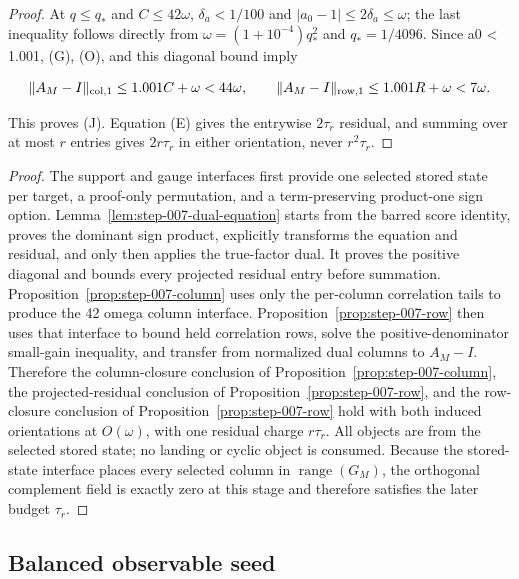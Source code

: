\begin{proposition}
\begin{proof}
At $q\le q_*$ and $C\le42\omega$, $\delta_a<1/100$ and
$|a_0-1|\le2\delta_a\le\omega$; the last inequality follows directly from
$\omega=(1+10^{-4})q_*^2$ and $q_*=1/4096$.
Since a0 < 1.001, (G), (O), and this diagonal bound imply

\[
\|A_M-I\|_{\rm col,1}\le1.001C+\omega<44\omega,\qquad
\|A_M-I\|_{\rm row,1}\le1.001R+\omega<7\omega.
\]

This proves (J). Equation (E) gives the entrywise $2\tau_r$ residual, and
summing over at most $r$ entries gives $2r\tau_r$ in either orientation,
never $r^2\tau_r$.\quad\Box

\end{proof}
\end{proposition}
\begin{proof}
The support and gauge interfaces first provide one selected
stored state per target, a proof-only permutation, and a term-preserving
product-one sign option.  Lemma~\ref{lem:step-007-dual-equation} starts from the
barred score identity, proves the dominant sign product, explicitly
transforms the equation and residual, and only then applies the true-factor
dual.  It proves the positive diagonal and bounds every projected residual
entry before summation.  Proposition~\ref{prop:step-007-column} uses
only the per-column correlation tails to produce the 42 omega
column interface.  Proposition~\ref{prop:step-007-row} then uses that interface
to bound held correlation rows, solve the positive-denominator small-gain
inequality, and transfer from normalized dual columns to $A_M-I$. Therefore
the column-closure conclusion of Proposition~\ref{prop:step-007-column}, the projected-residual conclusion of Proposition~\ref{prop:step-007-row}, and the row-closure conclusion of Proposition~\ref{prop:step-007-row} hold with both induced orientations at
$O(\omega)$, with one residual charge $r\tau_r$. All objects are from the
selected stored state; no landing or cyclic object is consumed.
Because the stored-state interface places every selected column in
$\operatorname{range}(G_M)$, the orthogonal complement field is exactly zero
at this stage and therefore satisfies the later budget $\tau_r$.
\end{proof}

\subsection{Balanced observable seed}\label{app:step-008}

